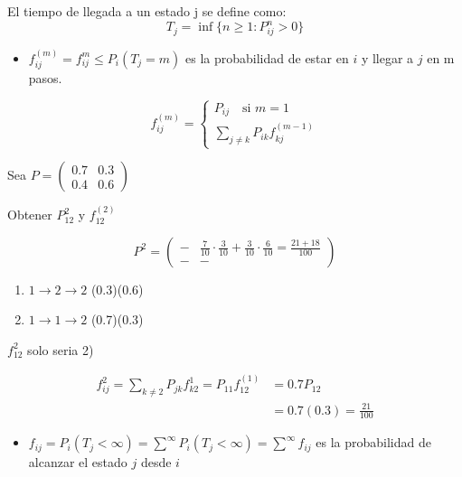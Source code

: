 \begin{defi}{}{}
    El tiempo de llegada a un estado j se define como:
    \[T_{j} = \inf\{n \geq 1 : P_{ij}^{n}>0\}\]
\end{defi}

\begin{itemize}
    \item $f_{ij}^{(m)} = f_{ij}^{m} \leq P_{i}(T_{j} = m)$ es la probabilidad de estar en $i$ y llegar a $j$ en  m pasos.
\end{itemize}

\[
f_{ij}^{(m)} = \begin{cases}
    P_{ij} \quad \text{si } m=1 \\
    \sum_{j \neq k} P_{ik} f_{kj}^{(m-1)} 
\end{cases}
\]

\begin{mybox}{}{}
    Sea $P = \begin{pmatrix}
        0.7 & 0.3 \\
        0.4 & 0.6
    \end{pmatrix}$
\end{mybox}

Obtener $P_{12}^{2}$ y $f_{12}^{(2)}$

\[
P^{2} = \begin{pmatrix*}
    - & \frac{7}{10} \cdot \frac{3}{10} + \frac{3}{10} \cdot \frac{6}{10} = \frac{21+18}{100}\\
    - & -
\end{pmatrix*}
\]

\begin{enumerate}
    \item $1 \to 2 \to 2$ (0.3)(0.6)
    \item $1 \to 1 \to 2$ (0.7)(0.3)
\end{enumerate}

$f_{12}^{2}$ solo seria 2)

\begin{align*}
    f_{ij}^{2} = \sum_{k \neq 2} P_{jk}f_{k2}^{1} = P_{11}f_{12}^{(1)} & = 0.7P_{12} \\
    & = 0.7(0.3)= \frac{21}{100}
\end{align*}

\begin{itemize}
    \item $f_{ij} = P_{i} (T_{j} < \infty) = \sum^{\infty}P_{i}(T_{j}<\infty) = \sum^{\infty}f_{ij}$ es la probabilidad de alcanzar el estado $j$ desde $i$
\end{itemize}

